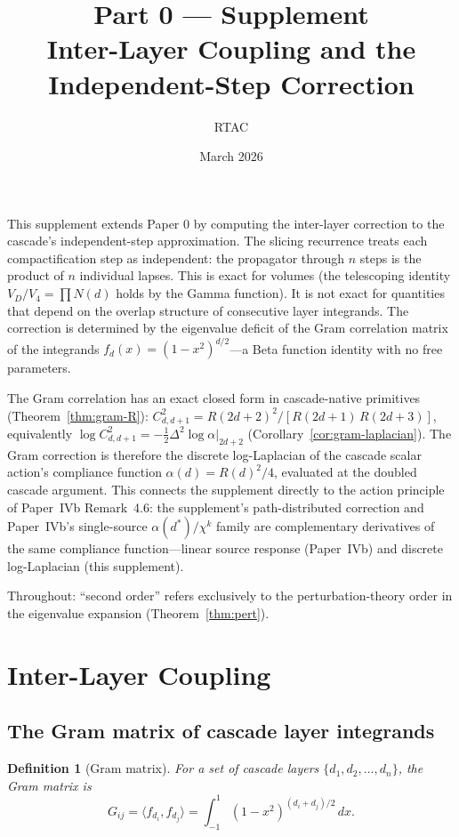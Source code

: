 \documentclass[12pt,a4paper]{article}
\title{Part 0 --- Supplement\\[6pt]
\large Inter-Layer Coupling and the Independent-Step Correction}
\author{RTAC}
\date{March 2026}
\newtheorem{definition}[theorem]{Definition}
\theoremstyle{remark}
\begin{document}
\setlength{\emergencystretch}{3em}
\maketitle

\noindent This supplement extends Paper 0 by computing the inter-layer correction to the cascade's independent-step approximation. The slicing recurrence treats each compactification step as independent: the propagator through $n$ steps is the product of $n$ individual lapses. This is exact for volumes (the telescoping identity $V_D/V_4 = \prod N(d)$ holds by the Gamma function). It is not exact for quantities that depend on the overlap structure of consecutive layer integrands. The correction is determined by the eigenvalue deficit of the Gram correlation matrix of the integrands $f_d(x) = (1 - x^2)^{d/2}$---a Beta function identity with no free parameters.

The Gram correlation has an exact closed form in cascade-native primitives (Theorem~\ref{thm:gram-R}): $C^2_{d,d+1} = R(2d+2)^2 / [R(2d+1)\,R(2d+3)]$, equivalently $\log C^2_{d,d+1} = -\tfrac{1}{2}\Delta^2 \log\alpha\big|_{2d+2}$ (Corollary~\ref{cor:gram-laplacian}). The Gram correction is therefore the discrete log-Laplacian of the cascade scalar action's compliance function $\alpha(d) = R(d)^2/4$, evaluated at the doubled cascade argument. This connects the supplement directly to the action principle of Paper~IVb Remark~4.6: the supplement's path-distributed correction and Paper~IVb's single-source $\alpha(d^*)/\chi^k$ family are complementary derivatives of the same compliance function---linear source response (Paper~IVb) and discrete log-Laplacian (this supplement).

Throughout: ``second order'' refers exclusively to the perturbation-theory order in the eigenvalue expansion (Theorem~\ref{thm:pert}).

\setcounter{section}{14}
\section{Inter-Layer Coupling}

\subsection{The Gram matrix of cascade layer integrands}

\begin{definition}[Gram matrix]
For a set of cascade layers $\{d_1, d_2, \ldots, d_n\}$, the Gram matrix is
\[
G_{ij} = \langle f_{d_i}, f_{d_j} \rangle = \int_{-1}^{1} (1 - x^2)^{(d_i + d_j)/2}\, dx.
\]
\end{definition}
\end{document}
